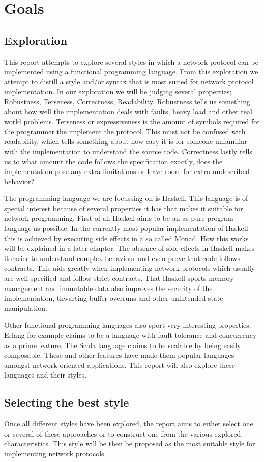 \chapter{Goals}
\section{Exploration}
This report attempts to explore several styles in which a network protocol can be implemented using a functional programming language. From this exploration we attempt to distill a style and/or syntax that is most suited for network protocol implementation. In our exploration we will be judging several properties; Robustness, Terseness, Correctness, Readability. Robustness tells us something about how well the implementation deals with faults, heavy load and other real world problems. Terseness or expressiveness is the amount of symbols required for the programmer the implement the protocol. This must not be confused with readability, which tells something about how easy it is for someone unfamiliar with the implementation to understand the source code. Correctness lastly tells us to what amount the code follows the specification exactly, does the implementation pose any extra limitations or leave room for extra undescribed behavior?

The programming language we are focussing on is Haskell. This language is of special interest because of several properties it has that makes it suitable for network programming. First of all Haskell aims to be an as pure program language as possible. In the currently most popular implementation of Haskell this is achieved by executing side effects in a so called Monad. How this works will be explained in a later chapter. The absence of side effects in Haskell makes it easier to understand complex behaviour and even prove that code follows contracts. This aids greatly when implementing network protocols which usually are well specified and follow strict contracts. That Haskell sports memory management and immutable data also improves the security of the implementation, thwarting buffer overruns and other unintended state manipulation.

Other functional programming languages also sport very interesting properties. Erlang for example claims to be a language with fault tolerance and concurrency as a prime feature\cite{armstrong_concurrent_1993}. The Scala language claims to be scalable by being easily composable\cite{odersky_overview_????}. These and other features have made them popular languages amongst network oriented applications. This report will also explore these languages and their styles.

\section{Selecting the best style}
Once all different styles have been explored, the report aims to either select one or several of these approaches or to construct one from the various explored characteristics. This style will be then be proposed as the most suitable style for implementing network protocols.
